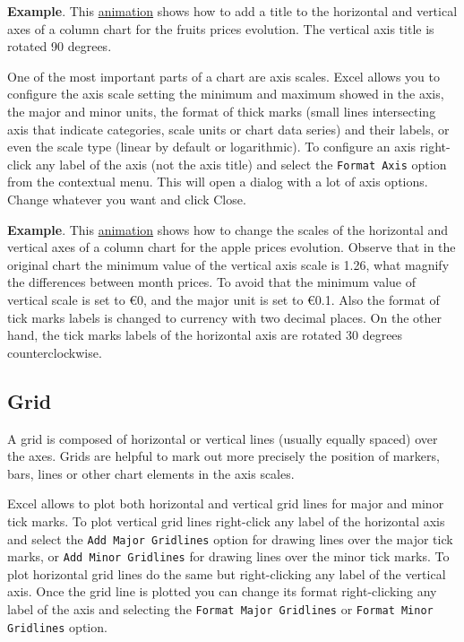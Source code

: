 \textbf{Example}. This \href{http://aprendeconalf.es/office/excel/manual/img/example_chart_axis_title.gif}{animation} shows how to add a title to the horizontal and vertical axes of a column chart for the fruits prices evolution. The vertical axis title is rotated 90 degrees.

One of the most important parts of a chart are axis scales. Excel allows you to configure the axis scale setting the minimum and maximum showed in the axis, the major and minor units, the format of thick marks (small lines intersecting axis that indicate categories, scale units or chart data series) and their labels, or even the scale type (linear by default or logarithmic). To configure an axis right-click any label of the axis (not the axis title) and select the \texttt{Format Axis} option from the contextual menu. This will open a dialog with a lot of axis options. Change whatever you want and click Close.

\textbf{Example}. This \href{http://aprendeconalf.es/office/excel/manual/img/example_chart_axis_scale.gif}{animation} shows
how to change the scales of the horizontal and vertical axes of a column chart for the apple prices evolution.
Observe that in the original chart the minimum value of the vertical axis scale is 1.26, what magnify the differences between month prices. To avoid that the minimum value of vertical scale is set to €0, and the major unit is set to €0.1. Also the format of tick marks labels is changed to currency with two decimal places. On the other hand, the tick marks labels of the horizontal axis are rotated 30 degrees counterclockwise.


\subsection{Grid}\hypertarget{grid}{}\label{grid}

A grid is composed of horizontal or vertical lines (usually equally spaced) over the axes. Grids are helpful to mark out more precisely the position of markers, bars, lines or other chart elements in the axis scales.

Excel allows to plot both horizontal and vertical grid lines for major and minor tick marks. To plot vertical grid lines right-click any label of the horizontal axis and select the \texttt{Add Major Gridlines} option for drawing lines over the major tick marks, or \texttt{Add Minor Gridlines} for drawing lines over the minor tick marks. To plot horizontal grid lines do the same but right-clicking any label of the vertical axis. Once the grid line is plotted you can change its format right-clicking any label of the axis and selecting the \texttt{Format Major Gridlines} or \texttt{Format Minor Gridlines} option.

